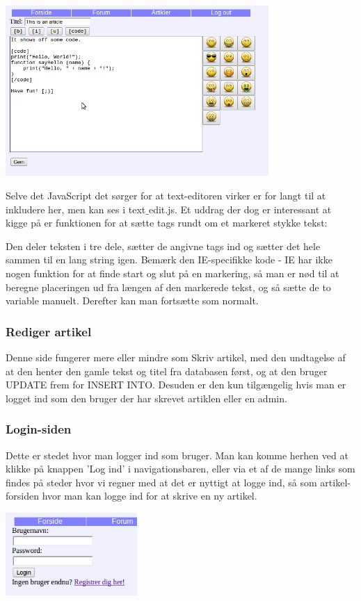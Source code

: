 \documentclass{article}
\begin{document}
\includegraphics[width=100mm]{mi04.png}

Selve det JavaScript det sørger for at text-editoren virker er for langt til at inkludere her, men kan ses i text$\_$edit.js. Et uddrag der dog er interessant at kigge på er funktionen for at sætte tags rundt om et markeret stykke tekst:



Den deler teksten i tre dele, sætter de angivne tags ind og sætter det hele sammen til en lang string igen. Bemærk den IE-specifikke kode - IE har ikke nogen funktion for at finde start og slut på en markering, så man er nød til at beregne placeringen ud fra længen af den markerede tekst, og så sætte de to variable manuelt. Derefter kan man fortsætte som normalt.

\subsubsection{Rediger artikel}
Denne side fungerer mere eller mindre som Skriv artikel, med den undtagelse af at den henter den gamle tekst og titel fra databasen først, og at den bruger UPDATE frem for INSERT INTO. Desuden er den kun tilgængelig hvis man er logget ind som den bruger der har skrevet artiklen eller en admin.

\subsubsection{Login-siden}
Dette er stedet hvor man logger ind som bruger. Man kan komme herhen ved at klikke på knappen 'Log ind' i navigationsbaren, eller via et af de mange links som findes på steder hvor vi regner med at det er nyttigt at logge ind, så som artikel-forsiden hvor man kan logge ind for at skrive en ny artikel.

\begin{center}
\includegraphics[width=50mm]{mi07.png}
\end{center}
\end{document}
